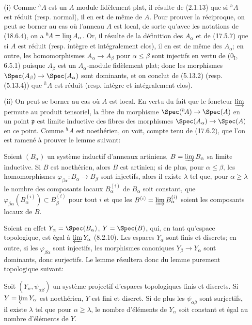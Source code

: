 
(i) Comme ${}^h\!A$ est un $A$-module fidèlement plat, il résulte de (2.1.13) que si ${}^h\!A$ est réduit (resp. normal), il en est de même de $A$. Pour prouver la réciproque, on peut se borner au cas où l'anneau $A$ est local, de sorte qu'avec les notations de (18.6.4), on a ${}^h\!A=\varinjlim A_\alpha$. Or, il résulte de la définition des $A_\alpha$ et de (17.5.7) que si $A$ est réduit (resp. intègre et intégralement clos), il en est de même des $A_\alpha$; en outre, les homomorphismes $A_\alpha\to A_\beta$ pour $\alpha\leq\beta$ sont injectifs en vertu de ($0_{\mathrm I}$, 6.5.1) puisque $A_\beta$ est un $A_\alpha$-module fidèlement plat; donc les morphismes $\Spec(A_\beta)\to\Spec(A_\alpha)$ sont dominants, et on conclut de (5.13.2) (resp. (5.13.4)) que ${}^h\!A$ est réduit (resp. intègre et intégralement clos).

(ii) On peut se borner au cas où $A$ est local. En vertu du fait que le foncteur $\varinjlim$ permute au produit tensoriel, la fibre du morphisme $\Spec({}^h\!A)\to\Spec(A)$ en un point $\mathfrak p$ est limite inductive des fibres des morphismes $\Spec(A_\alpha)\to\Spec(A)$ en ce point. Comme ${}^h\!A$ est noethérien, on voit, compte tenu de (17.6.2), que l'on est ramené à prouver le lemme suivant:

\begin{lemma}[18.6.9.1]
\label{IV.18.6.9.1}
Soient $(B_\alpha)$ un système inductif d'anneaux artiniens, $B=\varinjlim B_\alpha$ sa limite inductive. Si $B$ est noethérien, alors $B$ est artinien; si de plus, pour $\alpha\leq\beta$, les homomorphismes $\varphi_{\beta\alpha}:B_\alpha\to B_\beta$ sont injectifs, alors il existe $\lambda$ tel que, pour $\alpha\geq\lambda$ le nombre des composants locaux $B_\alpha^{(i)}$ de $B_\alpha$ soit constant, que $\varphi_{\beta\alpha}(B_\alpha^{(i)})\subset B_\beta^{(i)}$ pour tout $i$ et que les $B^{(i)}=\varinjlim B_\alpha^{(i)}$ soient les composants locaux de $B$.
\end{lemma}

Soient en effet $Y_\alpha=\Spec(B_\alpha)$, $Y=\Spec(B)$, qui, en tant qu'espace topologique, est égal à $\varprojlim Y_\alpha$ (8.2.10). Les espaces $Y_\alpha$ sont finis et discrets; en outre, si les $\varphi_{\beta\alpha}$ sont injectifs, les morphismes canoniques $Y_\beta\to Y_\alpha$ sont dominants, donc surjectifs. Le lemme résultera donc du lemme purement topologique suivant:

\begin{lemma}[18.6.9.2]
\label{IV.18.6.9.2}
Soit $(Y_\alpha,\psi_{\alpha\beta})$ un système projectif d'espaces topologiques finis et discrets. Si $Y=\varprojlim Y_\alpha$ est noethérien, $Y$ est fini et discret. Si de plus les $\psi_{\alpha\beta}$ sont surjectifs, il existe $\lambda$ tel que pour $\alpha\geq\lambda$, le nombre d'éléments de $Y_\alpha$ soit constant et égal au nombre d'éléments de $Y$.
\end{lemma}

